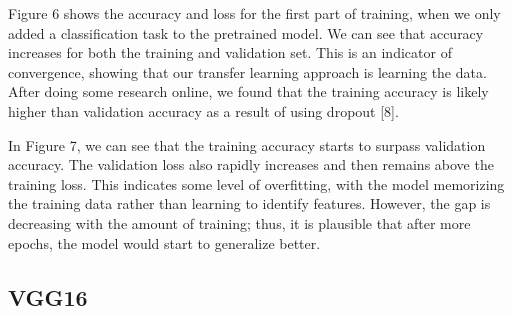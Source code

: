 \documentclass[letterpaper]{article} %
\begin{document}
Figure 6 shows the accuracy and loss for the first part of training, when we only added a classification task to the pretrained model. We can see that accuracy increases for both the training and validation set. This is an indicator of convergence, showing that our transfer learning approach is learning the data. After doing some research online, we found that the training accuracy is likely higher than validation accuracy as a result of using dropout [8].

In Figure 7, we can see that the training accuracy starts to surpass validation accuracy. The validation loss also rapidly increases and then remains above the training loss. This indicates some level of overfitting, with the model memorizing the training data rather than learning to identify features. However, the gap is decreasing with the amount of training; thus, it is plausible that after more epochs, the model would start to generalize better. 

\subsection{VGG16}
\end{document}
